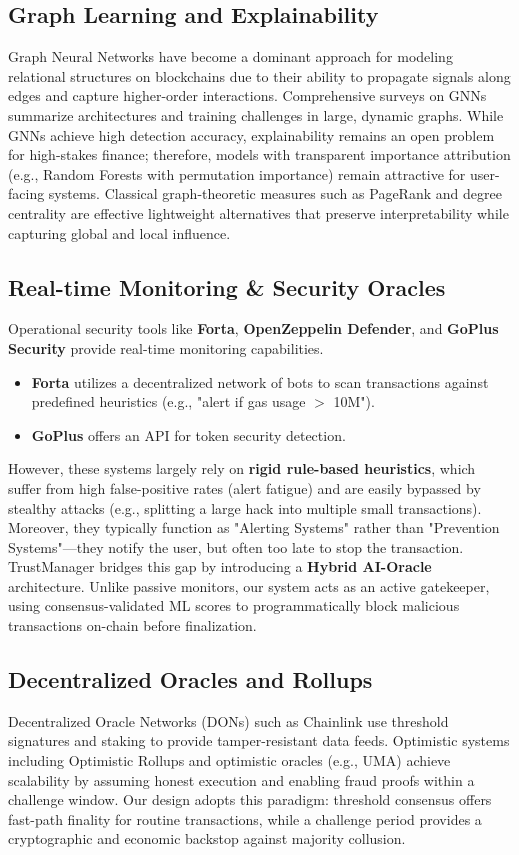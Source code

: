 \subsection{Graph Learning and Explainability}
Graph Neural Networks have become a dominant approach for modeling relational structures on blockchains due to their ability to propagate signals along edges and capture higher-order interactions. Comprehensive surveys on GNNs summarize architectures and training challenges in large, dynamic graphs. While GNNs achieve high detection accuracy, explainability remains an open problem for high-stakes finance; therefore, models with transparent importance attribution (e.g., Random Forests with permutation importance) remain attractive for user-facing systems. Classical graph-theoretic measures such as PageRank and degree centrality are effective lightweight alternatives that preserve interpretability while capturing global and local influence.

\subsection{Real-time Monitoring & Security Oracles}
Operational security tools like \textbf{Forta}, \textbf{OpenZeppelin Defender}, and \textbf{GoPlus Security} provide real-time monitoring capabilities.
\begin{itemize}
    \item \textbf{Forta} utilizes a decentralized network of bots to scan transactions against predefined heuristics (e.g., "alert if gas usage $>$ 10M").
    \item \textbf{GoPlus} offers an API for token security detection.
\end{itemize}
However, these systems largely rely on \textbf{rigid rule-based heuristics}, which suffer from high false-positive rates (alert fatigue) and are easily bypassed by stealthy attacks (e.g., splitting a large hack into multiple small transactions). Moreover, they typically function as "Alerting Systems" rather than "Prevention Systems"—they notify the user, but often too late to stop the transaction.
TrustManager bridges this gap by introducing a \textbf{Hybrid AI-Oracle} architecture. Unlike passive monitors, our system acts as an active gatekeeper, using consensus-validated ML scores to programmatically block malicious transactions on-chain before finalization.

\subsection{Decentralized Oracles and Rollups}
Decentralized Oracle Networks (DONs) such as Chainlink use threshold signatures and staking to provide tamper-resistant data feeds. Optimistic systems including Optimistic Rollups and optimistic oracles (e.g., UMA) achieve scalability by assuming honest execution and enabling fraud proofs within a challenge window. Our design adopts this paradigm: threshold consensus offers fast-path finality for routine transactions, while a challenge period provides a cryptographic and economic backstop against majority collusion.

